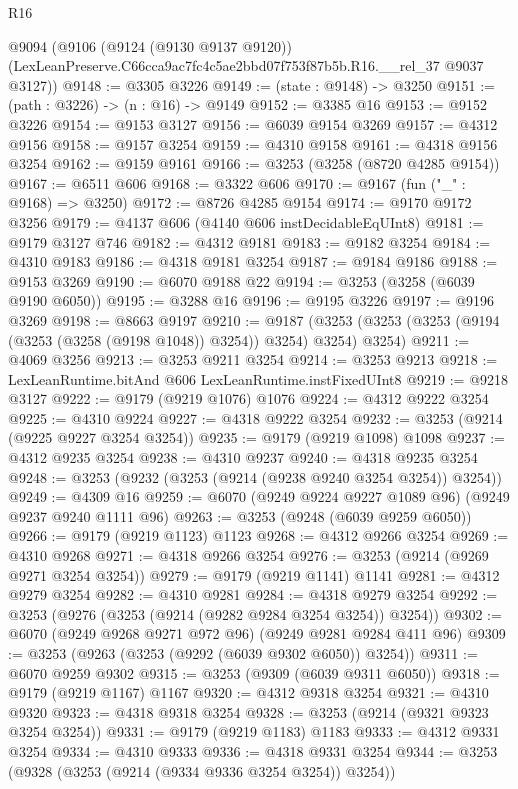 \begin{lexlean}{R16}
\begin{coremodule}
  @9094
    (@9106
      (@9124 (@9130 @9137 @9120))
      (LexLeanPreserve.C66cca9ac7fc4c5ae2bbd07f753f87b5b.R16.__rel_37 @9037 @3127))
@9148 := @3305 @3226
@9149 := (state : @9148) -> @3250
@9151 := (path : @3226) -> (n : @16) -> @9149
@9152 := @3385 @16
@9153 := @9152 @3226
@9154 := @9153 @3127
@9156 := @6039 @9154 @3269
@9157 := @4312 @9156
@9158 := @9157 @3254
@9159 := @4310 @9158
@9161 := @4318 @9156 @3254
@9162 := @9159 @9161
@9166 := @3253 (@3258 (@8720 @4285 @9154))
@9167 := @6511 @606
@9168 := @3322 @606
@9170 := @9167 (fun ("_" : @9168) => @3250)
@9172 := @8726 @4285 @9154
@9174 := @9170 @9172 @3256
@9179 := @4137 @606 (@4140 @606 instDecidableEqUInt8)
@9181 := @9179 @3127 @746
@9182 := @4312 @9181
@9183 := @9182 @3254
@9184 := @4310 @9183
@9186 := @4318 @9181 @3254
@9187 := @9184 @9186
@9188 := @9153 @3269
@9190 := @6070 @9188 @22
@9194 := @3253 (@3258 (@6039 @9190 @6050))
@9195 := @3288 @16
@9196 := @9195 @3226
@9197 := @9196 @3269
@9198 := @8663 @9197
@9210 := @9187 (@3253 (@3253 (@3253 (@9194 (@3253 (@3258 (@9198 @1048)) @3254)) @3254) @3254) @3254)
@9211 := @4069 @3256
@9213 := @3253 @9211 @3254
@9214 := @3253 @9213
@9218 := LexLeanRuntime.bitAnd @606 LexLeanRuntime.instFixedUInt8
@9219 := @9218 @3127
@9222 := @9179 (@9219 @1076) @1076
@9224 := @4312 @9222 @3254
@9225 := @4310 @9224
@9227 := @4318 @9222 @3254
@9232 := @3253 (@9214 (@9225 @9227 @3254 @3254))
@9235 := @9179 (@9219 @1098) @1098
@9237 := @4312 @9235 @3254
@9238 := @4310 @9237
@9240 := @4318 @9235 @3254
@9248 := @3253 (@9232 (@3253 (@9214 (@9238 @9240 @3254 @3254)) @3254))
@9249 := @4309 @16
@9259 := @6070 (@9249 @9224 @9227 @1089 @96) (@9249 @9237 @9240 @1111 @96)
@9263 := @3253 (@9248 (@6039 @9259 @6050))
@9266 := @9179 (@9219 @1123) @1123
@9268 := @4312 @9266 @3254
@9269 := @4310 @9268
@9271 := @4318 @9266 @3254
@9276 := @3253 (@9214 (@9269 @9271 @3254 @3254))
@9279 := @9179 (@9219 @1141) @1141
@9281 := @4312 @9279 @3254
@9282 := @4310 @9281
@9284 := @4318 @9279 @3254
@9292 := @3253 (@9276 (@3253 (@9214 (@9282 @9284 @3254 @3254)) @3254))
@9302 := @6070 (@9249 @9268 @9271 @972 @96) (@9249 @9281 @9284 @411 @96)
@9309 := @3253 (@9263 (@3253 (@9292 (@6039 @9302 @6050)) @3254))
@9311 := @6070 @9259 @9302
@9315 := @3253 (@9309 (@6039 @9311 @6050))
@9318 := @9179 (@9219 @1167) @1167
@9320 := @4312 @9318 @3254
@9321 := @4310 @9320
@9323 := @4318 @9318 @3254
@9328 := @3253 (@9214 (@9321 @9323 @3254 @3254))
@9331 := @9179 (@9219 @1183) @1183
@9333 := @4312 @9331 @3254
@9334 := @4310 @9333
@9336 := @4318 @9331 @3254
@9344 := @3253 (@9328 (@3253 (@9214 (@9334 @9336 @3254 @3254)) @3254))

\end{coremodule}
\end{lexlean}
